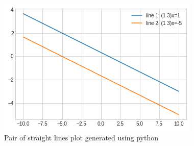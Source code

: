 \begin{figure}[!ht]
\centering
\includegraphics[width=\columnwidth]{./solutions/13/5/Straight_lines.png}
\caption{Pair of straight lines plot generated using python}
\label{eq:solutions/13/5/fig:plot}
\end{figure}
